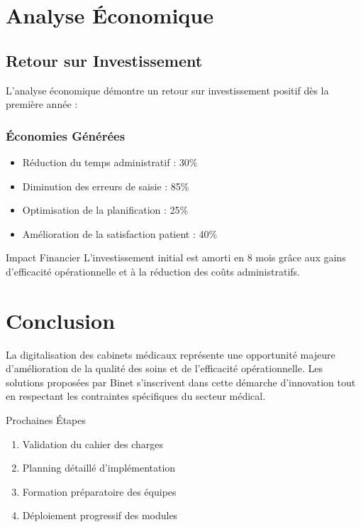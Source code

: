 \documentclass{modern-report}
\begin{document}
\chapter{Analyse Économique}

\section{Retour sur Investissement}

L'analyse économique démontre un retour sur investissement positif dès la première année :

\subsection{Économies Générées}

\begin{itemize}
    \item Réduction du temps administratif : 30\%
    \item Diminution des erreurs de saisie : 85\%
    \item Optimisation de la planification : 25\%
    \item Amélioration de la satisfaction patient : 40\%
\end{itemize}

\modernseparator

\begin{infobox}{Impact Financier}
L'investissement initial est amorti en 8 mois grâce aux gains d'efficacité opérationnelle et à la réduction des coûts administratifs.
\end{infobox}

\chapter*{Conclusion}

La digitalisation des cabinets médicaux représente une opportunité majeure d'amélioration de la qualité des soins et de l'efficacité opérationnelle. Les solutions proposées par Binet s'inscrivent dans cette démarche d'innovation tout en respectant les contraintes spécifiques du secteur médical.

\begin{modernbox}{Prochaines Étapes}
\begin{enumerate}
    \item Validation du cahier des charges
    \item Planning détaillé d'implémentation
    \item Formation préparatoire des équipes
    \item Déploiement progressif des modules
\end{enumerate}
\end{modernbox}
\end{document}
